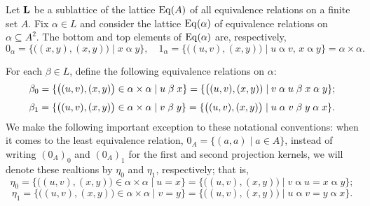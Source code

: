 \bigskip


Let $\mathbf{L}$ be a sublattice of the lattice $\operatorname{Eq}(A)$ of all
equivalence relations on a finite set $A$.  Fix $\alpha \in L$ and consider 
the lattice $\operatorname{Eq}(\alpha)$ of equivalence relations on
$\alpha\subseteq A^2$.  The bottom and top elements of $\operatorname{Eq}(\alpha)$
are, respectively, 
\[
0_\alpha = \{\bigl((x, y), (x, y)\bigr) \mid x \mathrel{\alpha} y \},
\quad
1_\alpha = \{\bigl((u, v), (x, y)\bigr) \mid u \mathrel{\alpha} v, \, 
x \mathrel{\alpha} y \} = \alpha \times \alpha.
\]

\noindent For each $\beta \in L$, define the following equivalence relations on $\alpha$:
\[
\beta_0 = \{\bigl((u, v), (x, y)\bigr) \in \alpha\times \alpha \mid u \mathrel{\beta} x\}
= \{\bigl((u, v), (x, y)) \mid v\mathrel{\alpha} u \mathrel{\beta} x \mathrel{\alpha} y\};
\]
\[
\beta_1 = \{\bigl((u, v), (x, y)\bigr) \in \alpha\times \alpha \mid v \mathrel{\beta} y\}
= \{\bigl((u, v), (x, y)\bigr) \mid u\mathrel{\alpha} v \mathrel{\beta} y \mathrel{\alpha} x\}.
\]
We make the following important exception to these notational conventions:
when it comes to the least equivalence relation, $0_A = \{(a,a)\mid a\in A\}$,
instead of writing $(0_A)_0$ and $(0_A)_1$ for the first and second projection kernels,
we will denote these realtions by $\eta_0$ and $\eta_1$, respectively; that is, 
\[
\eta_0 = \{ \bigl((u, v), (x, y)\bigr) \in \alpha \times \alpha \mid u = x\} = 
\{ \bigl((u,v), (x,y)\bigr) \mid v \mathrel{\alpha} u = x \mathrel{\alpha} y\};
\]
\[
\eta_1 = \{ \bigl((u, v), (x, y)\bigr) \in \alpha \times \alpha \mid v = y\} = 
\{ \bigl((u, v), (x, y)\bigr) \mid u \mathrel{\alpha} v = y \mathrel{\alpha} x\}.
\]

